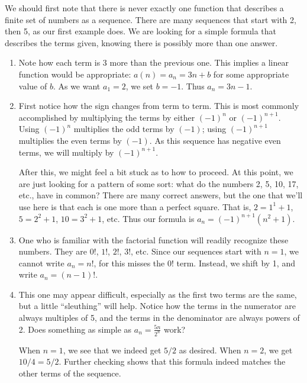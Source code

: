 {We should first note that there is never exactly one function that describes a finite set of numbers as a sequence. There are many sequences that start with 2, then 5, as our first example does. We are looking for a simple formula that describes the terms given, knowing there is possibly more than one answer.
\begin{enumerate}
\item		Note how each term is 3 more than the previous one. This implies a linear function would be appropriate: $a(n) = a_n = 3n + b$ for some appropriate value of $b$. As we want $a_1=2$, we set $b=-1$. Thus $a_n = 3n-1$.

\item		First notice how the sign changes from term to term. This is most commonly accomplished by multiplying the terms by either $(-1)^n$ or $(-1)^{n+1}$. Using $(-1)^n$ multiplies the odd terms by $(-1)$; using $(-1)^{n+1}$ multiplies the even terms by $(-1)$. As this sequence has negative even terms, we will multiply by $(-1)^{n+1}$. 

After this, we might feel a bit stuck as to how to proceed. At this point, we are just looking for a pattern of some sort: what do the numbers 2, 5, 10, 17, etc., have in common? There are many correct answers, but the one that we'll use here is that each is one more than a perfect square. That is, $2=1^1+1$, $5=2^2+1$, $10=3^2+1$, etc. Thus our formula is $a_n= (-1)^{n+1}(n^2+1)$.

\item		One who is familiar with the factorial function will readily recognize these numbers. They are $0!$, $1!$, $2!$, $3!$, etc. Since our sequences start with $n=1$, we cannot write $a_n = n!$, for this misses the $0!$ term. Instead, we shift by 1, and write $a_n = (n-1)!$.

\item		This one may appear difficult, especially as the first two terms are the same, but a little ``sleuthing'' will help. Notice how the terms in the numerator are always multiples of 5, and the terms in the denominator are always powers of 2. Does something as simple as $a_n = \frac{5n}{2^n}$ work?

When $n=1$, we see that we indeed get $5/2$ as desired. When $n=2$, we get $10/4 = 5/2$. Further checking shows that this formula indeed matches the other terms of the sequence.
\end{enumerate}
\baselineskip
}\\

